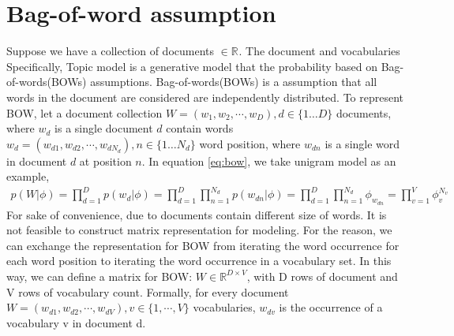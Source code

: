 \section{Bag-of-word assumption} 
Suppose we have a collection of documents $ \in\mathbb{R}^{} $. The document and vocabularies
Specifically, Topic model is a generative model that the probability based on Bag-of-words(BOWs) assumptions. Bag-of-words(BOWs) is a assumption that all words in the document are considered are independently distributed. To represent BOW, let a document collection $ W=(w_1,w_2,\cdots,w_D),d\in\{1\dots D\} $ documents, where $ w_d $ is a single document $ d $ contain words $ w_d=(w_{d1},w_{d2},\cdots,w_{dN_d}), n\in\{1\dots N_d\} $ word position, where $ w_{dn} $ is a single word in document $ d $ at position $ n $.
In equation \ref{eq:bow}, we take unigram model as an example\cite{__2015}, 
\begin{align}\label{eq:bow}
p(W|\phi)=\prod_{d=1}^{D}p(w_d|\phi)=\prod_{d=1}^{D}\prod_{n=1}^{N_d}p(w_{dn}|\phi)=\prod_{d=1}^{D}\prod_{n=1}^{N_d}\phi_{w_{dn}}=\prod_{v=1}^{V}\phi^{N_v}_{v}
\end{align}
For sake of convenience, due to documents contain different size of words. It is not feasible to construct matrix representation for modeling. For the reason, we can exchange the representation for BOW from iterating the word occurrence for each word position to iterating the word occurrence in a vocabulary set. In this way, we can define a matrix for BOW: $ W\in\mathbb{R}^{D\times V} $, with D rows of document and V rows of vocabulary count. Formally, for every document $ W=(w_{d1},w_{d2},\cdots,w_{dV}), v\in\{1,\cdots,V\} $ vocabularies, $ w_{dv} $ is the occurrence of a vocabulary v in document d.
